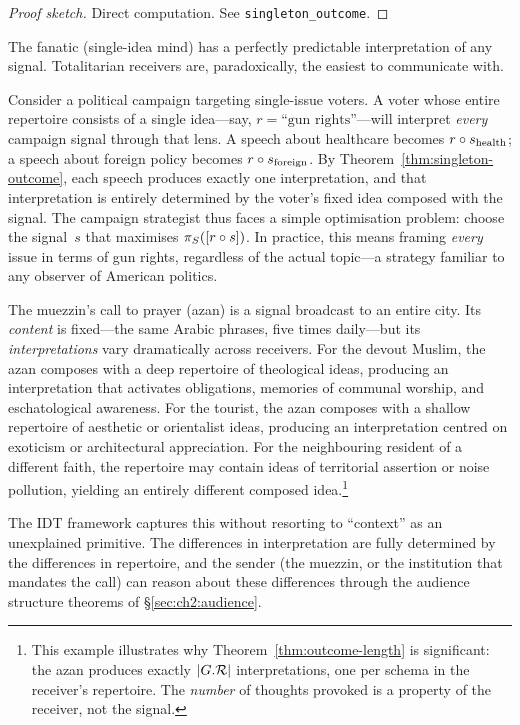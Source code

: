 \begin{proof}[Proof sketch]
Direct computation.  See \texttt{singleton\_outcome}.
\end{proof}

\begin{remark}
The fanatic (single-idea mind) has a perfectly predictable interpretation
of any signal.  Totalitarian receivers are, paradoxically, the easiest
to communicate with.
\end{remark}

\begin{example}
Consider a political campaign targeting single-issue voters.  A voter
whose entire repertoire consists of a single idea---say, $r = \text{``gun
rights''}$---will interpret \emph{every} campaign signal through that
lens.  A speech about healthcare becomes $r \circ s_{\text{health}}$;
a speech about foreign policy becomes $r \circ s_{\text{foreign}}$.
By Theorem~\ref{thm:singleton-outcome}, each speech produces exactly one
interpretation, and that interpretation is entirely determined by the
voter's fixed idea composed with the signal.  The campaign strategist
thus faces a simple optimisation problem: choose the signal~$s$ that
maximises $\pi_S([r \circ s])$.  In practice, this means framing
\emph{every} issue in terms of gun rights, regardless of the actual
topic---a strategy familiar to any observer of American politics.
\end{example}

\begin{example}
\label{ex:azan}
The muezzin's call to prayer (azan) is a signal broadcast to an entire
city.  Its \emph{content} is fixed---the same Arabic phrases, five times
daily---but its \emph{interpretations} vary dramatically across
receivers.  For the devout Muslim, the azan composes with a deep
repertoire of theological ideas, producing an interpretation that
activates obligations, memories of communal worship, and eschatological
awareness.  For the tourist, the azan composes with a shallow repertoire
of aesthetic or orientalist ideas, producing an interpretation centred on
exoticism or architectural appreciation.  For the neighbouring resident
of a different faith, the repertoire may contain ideas of territorial
assertion or noise pollution, yielding an entirely different composed
idea.\footnote{This example illustrates why Theorem~\ref{thm:outcome-length}
is significant: the azan produces exactly $|G.\mathcal{R}|$ interpretations,
one per schema in the receiver's repertoire.  The \emph{number} of
thoughts provoked is a property of the receiver, not the signal.}

The IDT framework captures this without resorting to ``context'' as an
unexplained primitive.  The differences in interpretation are fully
determined by the differences in repertoire, and the sender (the
muezzin, or the institution that mandates the call) can reason about
these differences through the audience structure theorems of
\S\ref{sec:ch2:audience}.
\end{example}

